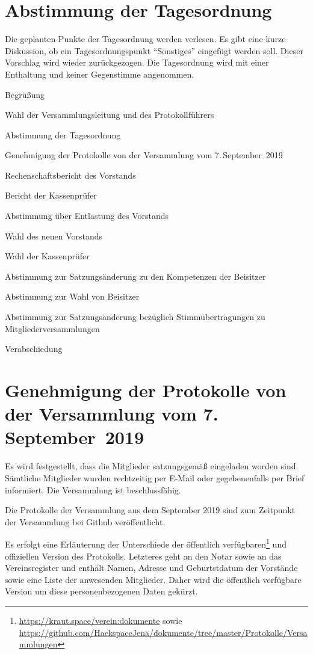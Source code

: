 \documentclass[DIV=calc,parksip=half*]{scrartcl}
\begin{document}
\section{Abstimmung der Tagesordnung}
Die geplanten Punkte der Tagesordnung werden verlesen. Es gibt eine kurze Diskussion, ob ein Tagesordnungspunkt \enquote{Sonstiges} eingefügt werden soll. Dieser Vorschlag wird wieder zurückgezogen. Die Tagesordnung wird mit einer Enthaltung und keiner Gegenstimme angenommen.
\begin{compactenum}
\item Begrüßung
\item Wahl der Versammlungsleitung und des Protokollführers
\item Abstimmung der Tagesordnung
\item  Genehmigung der Protokolle von der Versammlung vom 7.\,Sep\-tem\-ber~2019
\item  Rechenschaftsbericht des Vorstands
\item  Bericht der Kassenprüfer
\item Abstimmung über Entlastung des Vorstands
\item Wahl des neuen Vorstands
\item Wahl der Kassenprüfer
\item Abstimmung zur Satzungsänderung zu den Kompetenzen der Beisitzer
\item Abstimmung zur Wahl von Beisitzer
\item Abstimmung zur Satzungsänderung bezüglich Stimmübertragungen zu Mitgliederversammlungen
\item Verabschiedung
\end{compactenum}


\section{Genehmigung der Protokolle von der Versammlung vom 7.\,September~2019}


Es wird festgestellt, dass die Mitglieder satzungsgemäß eingeladen worden
sind. Sämtliche Mitglieder wurden rechtzeitig per E-Mail oder gegebenenfalls per
Brief informiert.  Die Versammlung ist beschlussfähig.

Die Protokolle der Versammlung aus dem September 2019 sind zum Zeitpunkt der
Versammlung bei Github veröffentlicht. 

Es erfolgt eine Erläuterung der Unterschiede der öffentlich verfügbaren\footnote{\url{https://kraut.space/verein:dokumente} sowie
\url{https://github.com/HackspaceJena/dokumente/tree/master/Protokolle/Versammlungen}} und offiziellen Version des Protokolls. Letzteres geht an den Notar sowie an das Vereinsregister und enthält Namen, Adresse und Geburtstdatum der Vorstände sowie eine Liste der anwesenden Mitglieder. Daher wird die öffentlich verfügbare Version um diese personenbezogenen Daten gekürzt.
\end{document}
